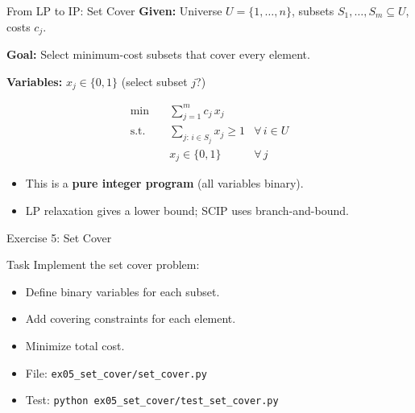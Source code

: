 \documentclass[aspectratio=169,10pt]{beamer}
\begin{document}
\begin{frame}{From LP to IP: Set Cover}
\textbf{Given:} Universe $U = \{1,\dots,n\}$, subsets $S_1,\dots,S_m \subseteq U$,
costs $c_j$.

\textbf{Goal:} Select minimum-cost subsets that cover every element.

\medskip
\textbf{Variables:} $x_j \in \{0,1\}$ (select subset $j$?)

\begin{align*}
  \min \quad & \sum_{j=1}^{m} c_j \, x_j \\
  \text{s.t.} \quad
    & \sum_{j:\, i \in S_j} x_j \ge 1
      & \forall\, i \in U \\
    & x_j \in \{0,1\}
      & \forall\, j
\end{align*}

\medskip
\begin{itemize}
  \item This is a \textbf{pure integer program} (all variables binary).
  \item LP relaxation gives a lower bound; SCIP uses branch-and-bound.
\end{itemize}
\end{frame}

\begin{frame}{Exercise 5: Set Cover}
\begin{block}{Task}
Implement the set cover problem:
\begin{itemize}
  \item Define binary variables for each subset.
  \item Add covering constraints for each element.
  \item Minimize total cost.
\end{itemize}
\end{block}
\begin{itemize}
  \item File: \texttt{ex05\_set\_cover/set\_cover.py}
  \item Test: \texttt{python ex05\_set\_cover/test\_set\_cover.py}
\end{itemize}
\end{frame}
\end{document}
